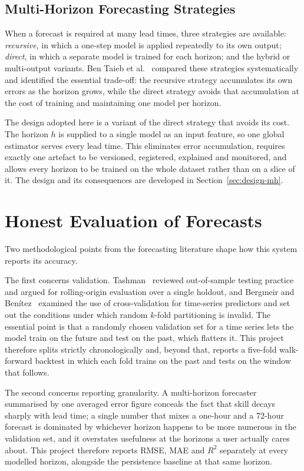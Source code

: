 \subsection{Multi-Horizon Forecasting Strategies}
When a forecast is required at many lead times, three strategies are available:
\emph{recursive}, in which a one-step model is applied repeatedly to its own
output; \emph{direct}, in which a separate model is trained for each horizon; and
the hybrid or multi-output variants. Ben Taieb et al.~\cite{ref:multistep}
compared these strategies systematically and identified the essential trade-off:
the recursive strategy accumulates its own errors as the horizon grows, while the
direct strategy avoids that accumulation at the cost of training and maintaining
one model per horizon.

The design adopted here is a variant of the direct strategy that avoids its cost.
The horizon $h$ is supplied to a single model as an input feature, so one global
estimator serves every lead time. This eliminates error accumulation, requires
exactly one artefact to be versioned, registered, explained and monitored, and
allows every horizon to be trained on the whole dataset rather than on a slice of
it. The design and its consequences are developed in Section~\ref{sec:design-mh}.

\section{Honest Evaluation of Forecasts}
Two methodological points from the forecasting literature shape how this system
reports its accuracy.

The first concerns validation. Tashman~\cite{ref:tashman} reviewed out-of-sample
testing practice and argued for rolling-origin evaluation over a single holdout,
and Bergmeir and Benítez~\cite{ref:bergmeir} examined the use of cross-validation
for time-series predictors and set out the conditions under which random $k$-fold
partitioning is invalid. The essential point is that a randomly chosen validation
set for a time series lets the model train on the future and test on the past,
which flatters it. This project therefore splits strictly chronologically and,
beyond that, reports a five-fold walk-forward backtest in which each fold trains
on the past and tests on the window that follows.

The second concerns reporting granularity. A multi-horizon forecaster summarised
by one averaged error figure conceals the fact that skill decays sharply with
lead time; a single number that mixes a one-hour and a 72-hour forecast is
dominated by whichever horizon happens to be more numerous in the validation set,
and it overstates usefulness at the horizons a user actually cares about. This
project therefore reports RMSE, MAE and $R^2$ separately at every modelled
horizon, alongside the persistence baseline at that same horizon.

